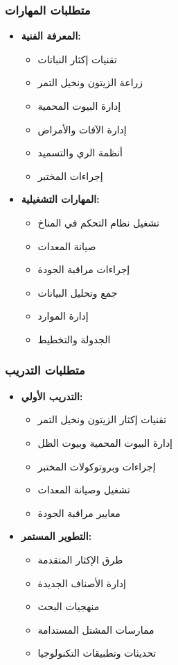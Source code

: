 \subsubsection{متطلبات المهارات}
\begin{itemize}
    \item \textbf{المعرفة الفنية:}
    \begin{itemize}
        \item تقنيات إكثار النباتات
        \item زراعة الزيتون ونخيل التمر
        \item إدارة البيوت المحمية
        \item إدارة الآفات والأمراض
        \item أنظمة الري والتسميد
        \item إجراءات المختبر
    \end{itemize}
    
    \item \textbf{المهارات التشغيلية:}
    \begin{itemize}
        \item تشغيل نظام التحكم في المناخ
        \item صيانة المعدات
        \item إجراءات مراقبة الجودة
        \item جمع وتحليل البيانات
        \item إدارة الموارد
        \item الجدولة والتخطيط
    \end{itemize}
\end{itemize}

\subsubsection{متطلبات التدريب}
\begin{itemize}
    \item \textbf{التدريب الأولي:}
    \begin{itemize}
        \item تقنيات إكثار الزيتون ونخيل التمر
        \item إدارة البيوت المحمية وبيوت الظل
        \item إجراءات وبروتوكولات المختبر
        \item تشغيل وصيانة المعدات
        \item معايير مراقبة الجودة
    \end{itemize}
    
    \item \textbf{التطوير المستمر:}
    \begin{itemize}
        \item طرق الإكثار المتقدمة
        \item إدارة الأصناف الجديدة
        \item منهجيات البحث
        \item ممارسات المشتل المستدامة
        \item تحديثات وتطبيقات التكنولوجيا
    \end{itemize}
\end{itemize}

